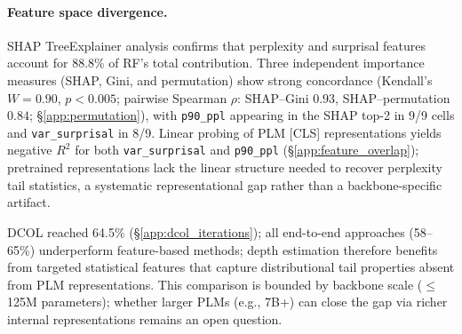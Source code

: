 \begin{table}[h]
\centering
\small
\caption{Per-class performance for end-to-end PLM classifiers vs.\ RF baseline (Pythia-1.4B nucleus). PLM columns report F1; RF d2 column reports recall (the class with the largest PLM--RF gap). Both PLM backbones share the same failure pattern: collapsed d1/d2 scores despite adequate d0/d3.}
\label{tab:e2e_detail}
\end{table}

\paragraph{Feature space divergence.}
SHAP TreeExplainer analysis confirms that perplexity and surprisal features account for 88.8\% of RF's total contribution.
Three independent importance measures (SHAP, Gini, and permutation) show strong concordance (Kendall's $W{=}0.90$, $p{<}0.005$; pairwise Spearman $\rho$: SHAP--Gini $0.93$, SHAP--permutation $0.84$; \S\ref{app:permutation}), with \texttt{p90\_ppl} appearing in the SHAP top-2 in 9/9 cells and \texttt{var\_surprisal} in 8/9.
Linear probing of PLM [CLS] representations yields negative $R^2$ for both \texttt{var\_surprisal} and \texttt{p90\_ppl} (\S\ref{app:feature_overlap}); pretrained representations lack the linear structure needed to recover perplexity tail statistics, a systematic representational gap rather than a backbone-specific artifact.

DCOL \cite{cloc2025} reached 64.5\% (\S\ref{app:dcol_iterations}); all end-to-end approaches (58--65\%) underperform feature-based methods; depth estimation therefore benefits from targeted statistical features that capture distributional tail properties absent from PLM representations.
This comparison is bounded by backbone scale ($\leq$125M parameters); whether larger PLMs (e.g., 7B+) can close the gap via richer internal representations remains an open question.


